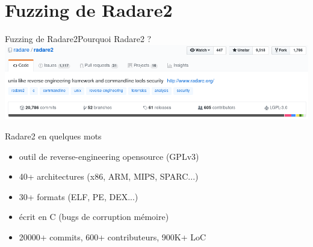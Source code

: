 \section{Fuzzing de Radare2}

\begin{frame}{Fuzzing de Radare2}{Pourquoi Radare2 ?}
  \includegraphics[width=\linewidth]{../medias/radare2-github.png}
  \begin{exampleblock}{Radare2 en quelques mots}
    \begin{itemize}
    \item{outil de reverse-engineering opensource (GPLv3)}
    \item{40+ architectures (x86, ARM, MIPS, SPARC...)}
    \item{30+ formats (ELF, PE, DEX...)}
    \item{écrit en C (bugs de corruption mémoire)}
    \item{20000+ commits, 600+ contributeurs, 900K+ LoC}
    \end{itemize}
  \end{exampleblock}
\end{frame}

